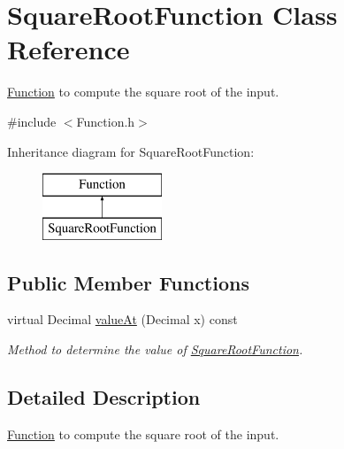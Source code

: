 \hypertarget{class_square_root_function}{\section{Square\+Root\+Function Class Reference}
\label{class_square_root_function}
}


\hyperlink{class_function}{Function} to compute the square root of the input.  




{\ttfamily \#include $<$Function.\+h$>$}

Inheritance diagram for Square\+Root\+Function\+:\begin{figure}[H]
\begin{center}
\leavevmode
\includegraphics[height=2.000000cm]{class_square_root_function}
\end{center}
\end{figure}
\subsection*{Public Member Functions}
\begin{DoxyCompactItemize}
\item 
virtual Decimal \hyperlink{class_square_root_function_a6044091d737d7bd72325621c2dc56a7a}{value\+At} (Decimal x) const 
\begin{DoxyCompactList}\small\item\em Method to determine the value of \hyperlink{class_square_root_function}{Square\+Root\+Function}. \end{DoxyCompactList}\end{DoxyCompactItemize}


\subsection{Detailed Description}
\hyperlink{class_function}{Function} to compute the square root of the input. 

